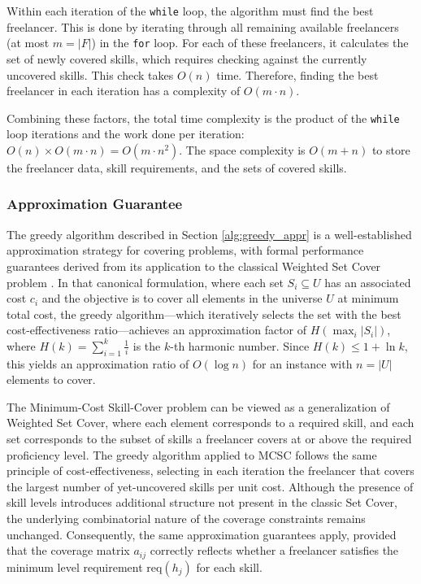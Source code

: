 \documentclass[12pt,a4paper]{article}
\begin{document}
Within each iteration of the \texttt{while} loop, the algorithm must find the best freelancer. This is done by iterating through all remaining available freelancers (at most $m = |F|$) in the \texttt{for} loop. For each of these freelancers, it calculates the set of newly covered skills, which requires checking against the currently uncovered skills. This check takes $O(n)$ time. Therefore, finding the best freelancer in each iteration has a complexity of $O(m \cdot n)$.

Combining these factors, the total time complexity is the product of the \texttt{while} loop iterations and the work done per iteration: $O(n) \times O(m \cdot n) = O(m \cdot n^2)$. The space complexity is $O(m+n)$ to store the freelancer data, skill requirements, and the sets of covered skills.

\subsubsection{Approximation Guarantee}

The greedy algorithm described in Section \ref{alg:greedy_appr} is a well-established approximation strategy for covering problems, with formal performance guarantees derived from its application to the classical Weighted Set Cover problem \cite{approx} \cite{cormen}. In that canonical formulation, where each set $S_i \subseteq U$ has an associated cost $c_i$ and the objective is to cover all elements in the universe $U$ at minimum total cost, the greedy algorithm---which iteratively selects the set with the best cost-effectiveness ratio---achieves an approximation factor of $H(\max_i |S_i|)$, where $H(k) = \sum_{i=1}^k \frac{1}{i}$ is the $k$-th harmonic number. Since $H(k) \leq 1 + \ln k$, this yields an approximation ratio of $O(\log n)$ for an instance with $n = |U|$ elements to cover.

The Minimum-Cost Skill-Cover problem can be viewed as a generalization of Weighted Set Cover, where each element corresponds to a required skill, and each set corresponds to the subset of skills a freelancer covers at or above the required proficiency level. The greedy algorithm applied to MCSC follows the same principle of cost-effectiveness, selecting in each iteration the freelancer that covers the largest number of yet-uncovered skills per unit cost. Although the presence of skill levels introduces additional structure not present in the classic Set Cover, the underlying combinatorial nature of the coverage constraints remains unchanged. Consequently, the same approximation guarantees apply, provided that the coverage matrix $a_{ij}$ correctly reflects whether a freelancer satisfies the minimum level requirement $\text{req}(h_j)$ for each skill.
\end{document}
